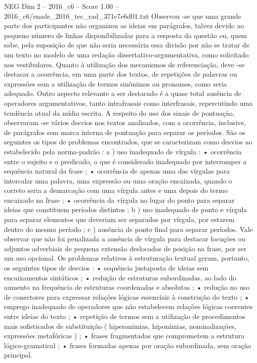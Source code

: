 \begin{textsample}{NEG Dim 2 – 2016\_c6 – Score 1.00 – 2016\_c6/enade\_2016\_tec\_rad\_371c7e6d01.txt}
Observou -se que uma grande parte dos participantes não organizou as ideias em parágrafos, talvez devido ao pequeno número de linhas disponibilizadas para a resposta da questão ou, quem sabe, pela suposição de que não seria necessária essa divisão por não se tratar de um texto no modelo de uma redação dissertativo-argumentativa, como solicitado nos vestibulares.
Quanto à utilização dos mecanismos de referenciação, deve -se destacar a ocorrência, em uma parte dos textos, de repetições de palavras ou expressões sem a utilização de termos sinônimos ou pronomes, como seria adequado.
Outro aspecto relevante a ser destacado é a quase total ausência de operadores argumentativos, tanto intrafrasais como interfrasais, repercutindo uma tendência atual da mídia escrita.
A respeito do uso dos sinais de pontuação, observaram -se vários desvios nos textos analisados, com a ocorrência, inclusive, de parágrafos sem marca interna de pontuação para separar os períodos.
São os seguintes os tipos de problemas encontrados, que se caracterizam como desvios ao estabelecido pela norma-padrão : a ) uso inadequado de vírgula : • ocorrência entre o sujeito e o predicado, o que é considerado inadequado por interromper a sequência natural da frase ; • ocorrência de apenas uma das vírgulas para intercalar uma palavra, uma expressão ou uma oração encaixada, quando o correto seria a demarcação com uma vírgula antes e uma depois do termo encaixado na frase ; • ocorrência da vírgula no lugar do ponto para separar ideias que constituem períodos distintos ; b ) uso inadequado de ponto e vírgula para separar elementos que deveriam ser separados por vírgula, por estarem dentro do mesmo período ; c ) ausência de ponto final para separar períodos.
Vale observar que não foi penalizada a ausência de vírgula para destacar locuções ou adjuntos adverbiais de pequena extensão deslocados de posição na frase, por ser um uso opcional.
Os problemas relativos à estruturação textual geram, portanto, os seguintes tipos de desvios : • sequência justaposta de ideias sem encaixamentos sintáticos ; • redução de estruturas subordinadas, ao lado do aumento na frequência de estruturas coordenadas e absolutas ; • redução no uso de conectores para expressar relações lógicas essenciais à construção do texto ; • emprego inadequado de operadores que não estabelecem relações lógicas coerentes entre ideias do texto ; • repetição de termos sem a utilização de procedimentos mais sofisticados de substituição ( hiperonímias, hiponímias, nominalizações, expressões metafóricas ) ; • frases fragmentadas que comprometem a estrutura lógico-gramatical ; • frases formadas apenas por oração subordinada, sem oração principal.

\end{textsample}
